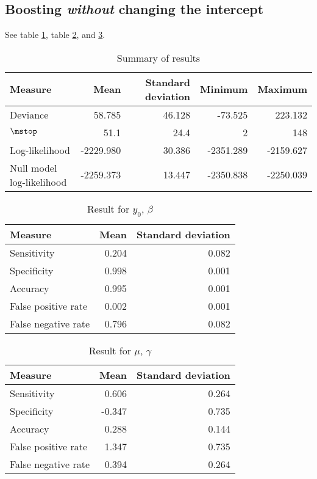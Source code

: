 \subsection{Boosting \textit{without} changing the intercept}
See table \ref{table:correlated-no-intercept-summary}, table \ref{table:correlated-no-intercept-y0}, and \ref{table:correlated-no-intercept-mu}.
\begin{table}\caption{Summary of results}\label{table:correlated-no-intercept-summary}
\begin{tabular}{l|rrrr}
Measure &    Mean &     Standard deviation &  Minimum & Maximum \\
\hline
Deviance    &    58.785 & 46.128 &   -73.525 &   223.132 \\
$\mstop$      &    51.1 & 24.4 &     2 &   148 \\
Log-likelihood      & -2229.980 & 30.386 & -2351.289 & -2159.627 \\
Null model log-likelihood & -2259.373 & 13.447 & -2350.838 & -2250.039
\end{tabular}
\end{table}

\begin{table}\caption{Result for $y_0$, $\beta$}\label{table:correlated-no-intercept-y0}
\begin{tabular}{l|rr}
Measure &  Mean &    Standard deviation \\
\hline
Sensitivity & 0.204 & 0.082 \\
Specificity & 0.998 & 0.001 \\
Accuracy    & 0.995 & 0.001 \\
False positive rate         & 0.002 & 0.001 \\
False negative rate         & 0.796 & 0.082
\end{tabular}
\end{table}


\begin{table}\caption{Result for $\mu$, $\gamma$}\label{table:correlated-no-intercept-mu}
\begin{tabular}{l|rr}
Measure     & Mean   & Standard deviation     \\
\hline
Sensitivity &  0.606 & 0.264 \\
Specificity & -0.347 & 0.735 \\
Accuracy    &  0.288 & 0.144 \\
False positive rate         &  1.347 & 0.735 \\
False negative rate         &  0.394 & 0.264
\end{tabular}
\end{table}
